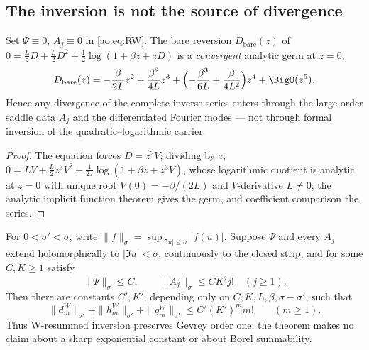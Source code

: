 \subsection{The inversion is not the source of divergence}

\begin{theorem}
\label{ao:thm:bare-skeleton}
Set $\Psi\equiv0$, $A_j\equiv0$ in \eqref{ao:eq:RW}.  The bare reversion
$D_{\mathrm{bare}}(z)$ of
$0=\tfrac LzD+\tfrac L2D^{2}
+\tfrac12\log(1+\beta z+zD)$ is a \emph{convergent} analytic germ at
$z=0$,
\begin{equation}
 D_{\mathrm{bare}}(z)
 =-\frac{\beta}{2L}z^{2}
 +\frac{\beta^{2}}{4L}z^{3}
 +\Bigl(-\frac{\beta^{3}}{6L}+\frac{\beta}{4L^{2}}\Bigr)z^{4}
 +\BigO(z^{5}).
 \label{ao:eq:bare-series}
\end{equation}
Hence any divergence of the complete inverse series enters through
the large-order saddle data $A_j$ and the differentiated Fourier
modes --- not through formal inversion of the
quadratic--logarithmic carrier.
\end{theorem}

\begin{proof}
The equation forces $D=z^{2}V$; dividing by $z$,
$0=LV+\tfrac L2z^{3}V^{2}
+\tfrac1{2z}\log(1+\beta z+z^{3}V)$, whose logarithmic quotient is
analytic at $z=0$ with unique root $V(0)=-\beta/(2L)$ and
$V$-derivative $L\ne0$; the analytic implicit function theorem gives
the germ, and coefficient comparison the series.
\end{proof}

\begin{theorem}
\label{ao:thm:gevrey-transfer}
For $0<\sigma'<\sigma$, write
$\|f\|_\sigma=\sup_{|\Im u|\le\sigma}|f(u)|$.  Suppose $\Psi$ and every
$A_j$ extend holomorphically to $|\Im u|<\sigma$, continuously to the
closed strip, and for some $C,K\ge1$ satisfy
\[
 \|\Psi\|_\sigma\le C,
 \qquad \|A_j\|_\sigma\le CK^j j!\quad(j\ge1).
\]
Then there are constants $C',K'$, depending only on
$C,K,L,\beta,\sigma-\sigma'$, such that
\[
 \|d_m^W\|_{\sigma'}+\|h_m^W\|_{\sigma'}+
 \|g_m^W\|_{\sigma'}
 \le C'(K')^m m!\qquad(m\ge1).
\]
Thus W-resummed inversion preserves Gevrey order one; the theorem makes no
claim about a sharp exponential constant or about Borel summability.
\end{theorem}

